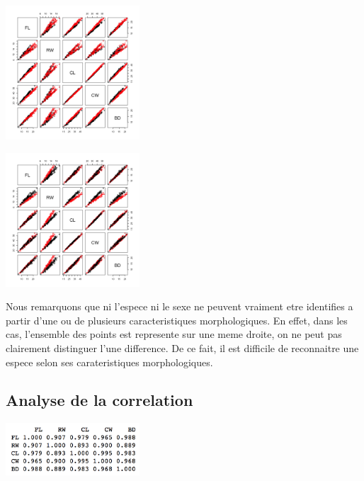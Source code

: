 \documentclass[]{report}
\begin{document}
\begin{minipage}[t]{0.6\textwidth}
	\includegraphics[width=50mm]{Figures/Crabs/plot_crabsquant_sp.png}
\end{minipage}
\begin{minipage}[t]{0.6\textwidth}
	\includegraphics[width=50mm]{Figures/Crabs/plot_crabsquant_sex.png}	
\end{minipage}
\begin{center}
	\label{fig:multiplot_crabs__sp_sex}
\end{center}

Nous remarquons que ni l'espece ni le sexe ne peuvent vraiment etre identifies a partir d'une ou de plusieurs caracteristiques morphologiques.
En effet, dans les cas, l'ensemble des points est represente sur une meme droite, on ne peut pas clairement distinguer l'une difference. De ce fait, il est difficile de reconnaitre une espece selon ses carateristiques morphologiques.

\subsection{Analyse de la correlation}

\begin{center}
	\includegraphics[width=50mm]{Figures/Crabs/cor_crabsquant.png}
	\label{fig:cor_carbsquant}
\end{center}
\end{document}

